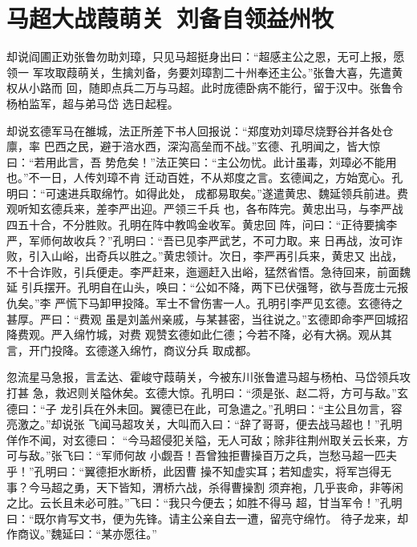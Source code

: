\chapter{马超大战葭萌关~刘备自领益州牧}

却说阎圃正劝张鲁勿助刘璋，只见马超挺身出曰：“超感主公之恩，无可上报，愿领一
军攻取葭萌关，生擒刘备，务要刘璋割二十州奉还主公。”张鲁大喜，先遣黄权从小路而
回，随即点兵二万与马超。此时庞德卧病不能行，留于汉中。张鲁令杨柏监军，超与弟马岱
选日起程。

却说玄德军马在雒城，法正所差下书人回报说：“郑度劝刘璋尽烧野谷并各处仓廪，率
巴西之民，避于涪水西，深沟高垒而不战。”玄德、孔明闻之，皆大惊曰：“若用此言，吾
势危矣！”法正笑曰：“主公勿忧。此计虽毒，刘璋必不能用也。”不一日，人传刘璋不肯
迁动百姓，不从郑度之言。玄德闻之，方始宽心。孔明曰：“可速进兵取绵竹。如得此处，
成都易取矣。”遂遣黄忠、魏延领兵前进。费观听知玄德兵来，差李严出迎。严领三千兵
也，各布阵完。黄忠出马，与李严战四五十合，不分胜败。孔明在阵中教鸣金收军。黄忠回
阵，问曰：“正待要擒李严，军师何故收兵？”孔明曰：“吾已见李严武艺，不可力取。来
日再战，汝可诈败，引入山峪，出奇兵以胜之。”黄忠领计。次日，李严再引兵来，黄忠又
出战，不十合诈败，引兵便走。李严赶来，迤逦赶入出峪，猛然省悟。急待回来，前面魏延
引兵摆开。孔明自在山头，唤曰：“公如不降，两下已伏强弩，欲与吾庞士元报仇矣。”李
严慌下马卸甲投降。军士不曾伤害一人。孔明引李严见玄德。玄德待之甚厚。严曰：“费观
虽是刘盖州亲戚，与某甚密，当往说之。”玄德即命李严回城招降费观。严入绵竹城，对费
观赞玄德如此仁德；今若不降，必有大祸。观从其言，开门投降。玄德遂入绵竹，商议分兵
取成都。

忽流星马急报，言孟达、霍峻守葭萌关，今被东川张鲁遣马超与杨柏、马岱领兵攻打甚
急，救迟则关隘休矣。玄德大惊。孔明曰：“须是张、赵二将，方可与敌。”玄德曰：“子
龙引兵在外未回。翼德已在此，可急遣之。”孔明曰：“主公且勿言，容亮激之。”却说张
飞闻马超攻关，大叫而入曰：“辞了哥哥，便去战马超也！”孔明佯作不闻，对玄德曰：
“今马超侵犯关隘，无人可敌；除非往荆州取关云长来，方可与敌。”张飞曰：“军师何故
小觑吾！吾曾独拒曹操百万之兵，岂愁马超一匹夫乎！”孔明曰：“翼德拒水断桥，此因曹
操不知虚实耳；若知虚实，将军岂得无事？今马超之勇，天下皆知，渭桥六战，杀得曹操割
须弃袍，几乎丧命，非等闲之比。云长且未必可胜。”飞曰：“我只今便去；如胜不得马
超，甘当军令！”孔明曰：“既尔肯写文书，便为先锋。请主公亲自去一遭，留亮守绵竹。
待子龙来，却作商议。”魏延曰：“某亦愿往。”

